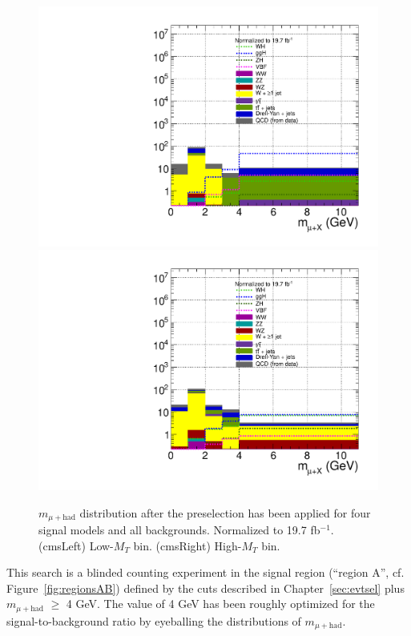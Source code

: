 \begin{figure}[hbtp]
  \begin{center}
    \includegraphics[width=\cmsFigWidth]{figures/sigVsBkg_muHadMass_lowMT_v87}
    \includegraphics[width=\cmsFigWidth]{figures/sigVsBkg_muHadMass_highMT_v87}
    \caption{$m_{\mu+\text{had}}$ distribution after the preselection has been applied for four signal models and all backgrounds. Normalized to 19.7 fb$^{-1}$. (cmsLeft) Low-$M_{T}$ bin. (cmsRight) High-$M_{T}$ bin.}
    \label{fig:muhad-mass-MC-region-A}
  \end{center}
\end{figure}

This search is a blinded counting experiment in the signal region (``region A'', cf. Figure~\ref{fig:regionsAB}) defined by the cuts described in Chapter~\ref{sec:evtsel} plus $m_{\mu+\text{had}}$ $\geq$ 4 GeV.  The value of 4 GeV has been roughly optimized for the signal-to-background ratio by eyeballing the distributions of $m_{\mu+\text{had}}$.

